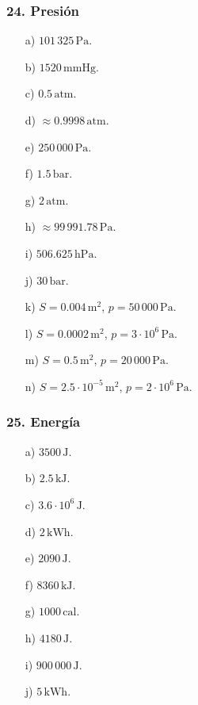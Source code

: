 \subsubsection*{24. Presión}
\begin{enumerate}
    \item[a)] $101\,325\,\mathrm{Pa}$.
    \item[b)] $1520\,\mathrm{mmHg}$.
    \item[c)] $0.5\,\mathrm{atm}$.
    \item[d)] $\approx0.9998\,\mathrm{atm}$.
    \item[e)] $250\,000\,\mathrm{Pa}$.
    \item[f)] $1.5\,\mathrm{bar}$.
    \item[g)] $2\,\mathrm{atm}$.
    \item[h)] $\approx99\,991.78\,\mathrm{Pa}$.
    \item[i)] $506.625\,\mathrm{hPa}$.
    \item[j)] $30\,\mathrm{bar}$.
    \item[k)] $S=0.004\,\mathrm{m^2}$, $p=50\,000\,\mathrm{Pa}$.
    \item[l)] $S=0.0002\,\mathrm{m^2}$, $p=3\cdot10^6\,\mathrm{Pa}$.
    \item[m)] $S=0.5\,\mathrm{m^2}$, $p=20\,000\,\mathrm{Pa}$.
    \item[n)] $S=2.5\cdot10^{-5}\,\mathrm{m^2}$,
    $p=2\cdot10^6\,\mathrm{Pa}$.
\end{enumerate}

\subsubsection*{25. Energía}
\begin{enumerate}
    \item[a)] $3500\,\mathrm{J}$.
    \item[b)] $2.5\,\mathrm{kJ}$.
    \item[c)] $3.6\cdot10^6\,\mathrm{J}$.
    \item[d)] $2\,\mathrm{kWh}$.
    \item[e)] $2090\,\mathrm{J}$.
    \item[f)] $8360\,\mathrm{kJ}$.
    \item[g)] $1000\,\mathrm{cal}$.
    \item[h)] $4180\,\mathrm{J}$.
    \item[i)] $900\,000\,\mathrm{J}$.
    \item[j)] $5\,\mathrm{kWh}$.
\end{enumerate}


